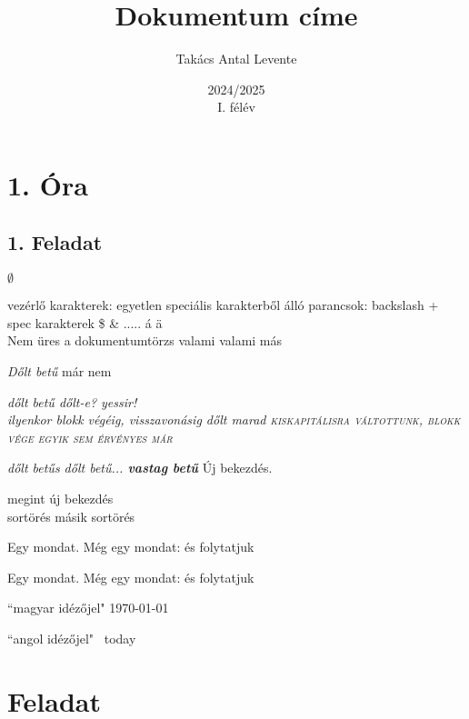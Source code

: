 \documentclass[12]{article}
\begin{document}
\title{Dokumentum címe} %
\author{Takács Antal Levente}
\date{2024/2025\\I. félév}

\maketitle
\newpage

\section{1. Óra}
\subsection{1. Feladat}

$\emptyset$ %

vezérlő karakterek: egyetlen speciális karakterből álló parancsok:
backslash + spec karakterek
\$ \& ..... \'a \"a \H \\
Nem üres a dokumentumtörzs
		valami
	valami más

\textit{Dőlt betű} már nem%

{\itshape{dőlt betű} dőlt-e? yessir!
\\
ilyenkor blokk végéig, visszavonásig dőlt marad
\scshape kiskapitálisra váltottunk, blokk vége egyik sem érvényes már
}\par
\textit{dőlt betűs dőlt betű...
\textbf{vastag betű} }
Új bekezdés.\par 
megint új bekezdés\\
sortörés\newline
másik sortörés

Egy mondat. Még egy mondat: és folytatjuk

\frenchspacing
Egy mondat. Még egy mondat: és folytatjuk

``magyar idézőjel" %
\today %

``angol idézőjel" \ today
\newpage



\section{Feladat}
\end{document}
